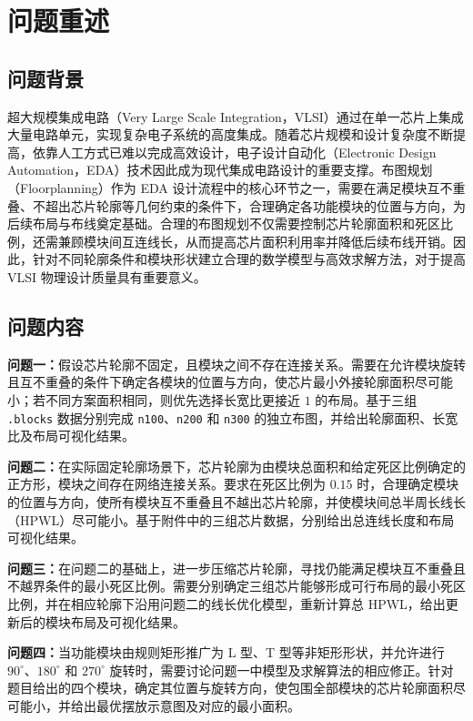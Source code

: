 \section{问题重述}

\subsection{问题背景}

超大规模集成电路（Very Large Scale Integration，VLSI）通过在单一芯片上集成大量电路单元，实现复杂电子系统的高度集成。随着芯片规模和设计复杂度不断提高，依靠人工方式已难以完成高效设计，电子设计自动化（Electronic Design Automation，EDA）技术因此成为现代集成电路设计的重要支撑。布图规划（Floorplanning）作为 EDA 设计流程中的核心环节之一，需要在满足模块互不重叠、不超出芯片轮廓等几何约束的条件下，合理确定各功能模块的位置与方向，为后续布局与布线奠定基础。合理的布图规划不仅需要控制芯片轮廓面积和死区比例，还需兼顾模块间互连线长，从而提高芯片面积利用率并降低后续布线开销。因此，针对不同轮廓条件和模块形状建立合理的数学模型与高效求解方法，对于提高 VLSI 物理设计质量具有重要意义。

\subsection{问题内容}

\noindent\textbf{问题一：}假设芯片轮廓不固定，且模块之间不存在连接关系。需要在允许模块旋转且互不重叠的条件下确定各模块的位置与方向，使芯片最小外接轮廓面积尽可能小；若不同方案面积相同，则优先选择长宽比更接近 $1$ 的布局。基于三组 \texttt{.blocks} 数据分别完成 \texttt{n100}、\texttt{n200} 和 \texttt{n300} 的独立布图，并给出轮廓面积、长宽比及布局可视化结果。

\noindent\textbf{问题二：}在实际固定轮廓场景下，芯片轮廓为由模块总面积和给定死区比例确定的正方形，模块之间存在网络连接关系。要求在死区比例为 $0.15$ 时，合理确定模块的位置与方向，使所有模块互不重叠且不越出芯片轮廓，并使模块间总半周长线长（HPWL）尽可能小。基于附件中的三组芯片数据，分别给出总连线长度和布局可视化结果。

\noindent\textbf{问题三：}在问题二的基础上，进一步压缩芯片轮廓，寻找仍能满足模块互不重叠且不越界条件的最小死区比例。需要分别确定三组芯片能够形成可行布局的最小死区比例，并在相应轮廓下沿用问题二的线长优化模型，重新计算总 HPWL，给出更新后的模块布局及可视化结果。

\noindent\textbf{问题四：}当功能模块由规则矩形推广为 L 型、T 型等非矩形形状，并允许进行 $90^\circ$、$180^\circ$ 和 $270^\circ$ 旋转时，需要讨论问题一中模型及求解算法的相应修正。针对题目给出的四个模块，确定其位置与旋转方向，使包围全部模块的芯片轮廓面积尽可能小，并给出最优摆放示意图及对应的最小面积。
